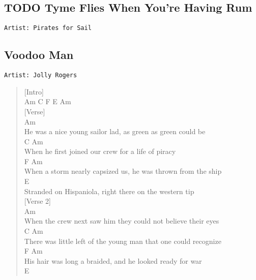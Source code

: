 \documentclass[11pt]{article}
\begin{document}
\subsection{{\bfseries\sffamily TODO} Tyme Flies When You're Having Rum}
\label{sec:org81a3ceb}
\begin{verbatim}
Artist: Pirates for Sail
\end{verbatim}
\clearpage
\subsection{Voodoo Man}
\label{sec:org89d3412}
\begin{verbatim}
Artist: Jolly Rogers
\end{verbatim}
\begin{verse}
[Intro]\\
\vspace*{1em}
Am C F E Am\\
\vspace*{1em}
[Verse]\\
Am\\
He was a nice young sailor lad, as green as green could be\\
\hspace*{8em}C                           Am\\
When he first joined our crew for a life of piracy\\
\hspace*{7em}F                                Am\\
When a storm nearly capsized us, he was thrown from the ship\\
E\\
Stranded on Hispaniola, right there on the western tip\\
\vspace*{1em}
[Verse 2]\\
Am\\
When the crew next saw him they could not believe their eyes\\
\hspace*{10em}C                                 Am\\
There was little left of the young man that one could recognize\\
\hspace*{4em}F                               Am\\
His hair was long a braided, and he looked ready for war\\
\hspace*{7em}E\\

\end{verse}
\end{document}
